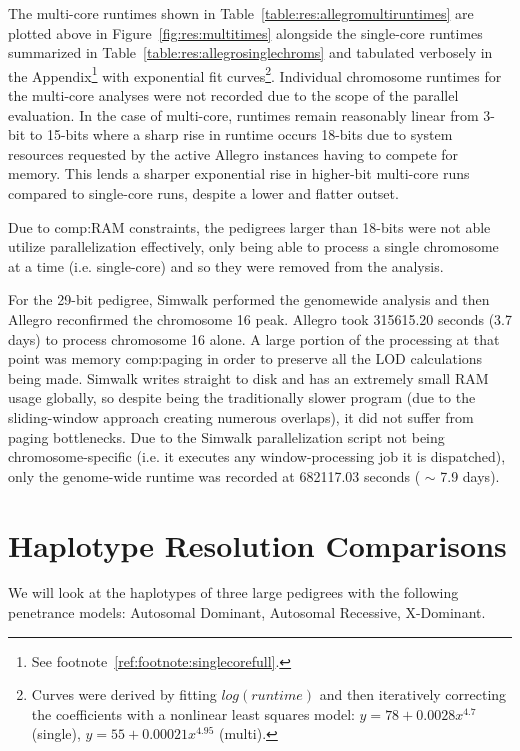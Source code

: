 \vspace{-10pt}
The multi-core runtimes shown in Table~\ref{table:res:allegromultiruntimes} are plotted above in Figure~\ref{fig:res:multitimes} alongside the single-core runtimes summarized in Table~\ref{table:res:allegrosinglechroms} and tabulated verbosely in the Appendix\footnote{See footnote~\ref{ref:footnote:singlecorefull}.} with exponential fit curves\footnote{Curves were derived by fitting $log(runtime)$ and then iteratively correcting the coefficients with a nonlinear least squares model: $ y = 78 + 0.0028x ^{4.7}$ (single), $ y = 55 + 0.00021x^{4.95}$ (multi).}. Individual chromosome runtimes for the multi-core analyses were not recorded due to the scope of the parallel evaluation. In the case of multi-core, runtimes remain reasonably linear from 3-bit to 15-bits where a sharp rise in runtime occurs 18-bits due to system resources requested by the active Allegro instances having to compete for memory. This lends a sharper exponential rise in higher-bit multi-core runs compared to single-core runs, despite a lower and flatter outset.

Due to \gls{comp:RAM} constraints, the pedigrees larger than 18-bits were not able utilize parallelization effectively, only being able to process a single chromosome at a time (i.e. single-core) and so they were removed from the analysis.

For the 29-bit pedigree, Simwalk performed the genomewide analysis and then Allegro reconfirmed the chromosome 16 peak. Allegro took 315615.20 seconds (3.7 days) to process chromosome 16 alone. A large portion of the processing at that point was memory \gls{comp:paging} in order to preserve all the LOD calculations being made. Simwalk writes straight to disk and has an extremely small RAM usage globally, so despite being the traditionally slower program (due to the sliding-window approach creating numerous overlaps), it did not suffer from paging bottlenecks. Due to the Simwalk parallelization script not being chromosome-specific (i.e. it executes any window-processing job it is dispatched), only the genome-wide runtime was recorded at 682117.03 seconds ( $\sim$ 7.9 days).



\section{Haplotype Resolution Comparisons}\label{ref:res:hapcomp}

We will look at the haplotypes of three large pedigrees with the following penetrance models: Autosomal Dominant, Autosomal Recessive, X-Dominant.

